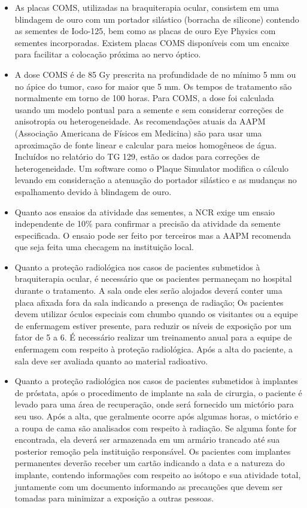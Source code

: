 \documentclass[11pt,a4paper]{article}
\newcounter{exemplo}
\begin{document}
\begin{exemplo}[8. Braquiterapia]
\begin{itemize}
        \item As placas COMS, utilizadas na braquiterapia ocular, consistem em uma blindagem de ouro com um portador silástico (borracha de silicone) contendo as sementes de Iodo-125, bem como as placas de ouro Eye Physics com sementes incorporadas. Existem placas COMS disponíveis com um encaixe para facilitar a colocação próxima ao nervo óptico. 
        
        \item A dose COMS é de 85 Gy prescrita na profundidade de no mínimo 5 mm ou no ápice do tumor, caso for maior que 5 mm. Os tempos de tratamento são normalmente em torno de 100 horas. Para COMS, a dose foi calculada usando um modelo pontual para a semente e sem considerar correções de anisotropia ou heterogeneidade. As recomendações atuais da AAPM (Associação Americana de Físicos em Medicina) são para usar uma aproximação de fonte linear e calcular para meios homogêneos de água. Incluídos no relatório do TG 129, estão os dados para correções de heterogeneidade. Um software como o Plaque Simulator modifica o cálculo levando em consideração a atenuação do portador silástico e as mudanças no espalhamento devido à blindagem de ouro.
        
        \item Quanto aos ensaios da atividade das sementes, a NCR exige um ensaio independente de 10\% para confirmar a precisão da atividade da semente especificada. O ensaio pode ser feito por terceiros mas a AAPM recomenda que seja feita uma checagem na instituição local.
        
        \item Quanto a proteção radiológica nos casos de pacientes submetidos à braquiterapia ocular, é necessário que os pacientes permaneçam no hospital durante o tratamento. A sala onde eles serão alojados deverá conter uma placa afixada fora da sala indicando a presença de radiação; Os pacientes devem utilizar óculos especiais com chumbo quando os visitantes ou a equipe de enfermagem estiver presente, para reduzir os níveis de exposição por um fator de 5 a 6. É necessário realizar um treinamento anual para a equipe de enfermagem com respeito à proteção radiológica. Após a alta do paciente, a sala deve ser avaliada quanto ao material radioativo. 
        
        \item Quanto a proteção radiológica nos casos de pacientes submetidos à implantes de próstata, após o procedimento de implante na sala de cirurgia, o paciente é levado para uma área de recuperação, onde será fornecido um mictório para seu uso. Após a alta, que geralmente ocorre após algumas horas, o mictório e a roupa de cama são analisados com respeito à radiação. Se alguma fonte for encontrada, ela deverá ser armazenada em um armário trancado até sua posterior remoção pela instituição responsável. Os pacientes com implantes permanentes deverão receber um cartão indicando a data e a natureza do implante, contendo informações com respeito ao isótopo e sua atividade total, juntamente com um documento informando as precauções que devem ser tomadas para minimizar a exposição a outras pessoas.
        

\end{itemize}
\end{exemplo}
\end{document}
